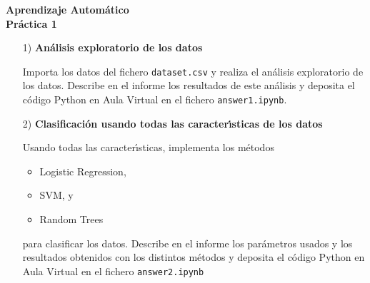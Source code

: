 \documentclass{article}
\begin{document}
\begin{center}
\bf{\large 
{\Large Aprendizaje Autom\'atico}\\
{\vspace{0.1cm}}
Pr\'actica 1
}
\end{center}

\bigskip

\begin{itemize}

\item[1)]  {\bf An\'alisis exploratorio de los datos}

Importa los datos del fichero \texttt{dataset.csv} y realiza el an\'alisis exploratorio de los datos. Describe en el informe los resultados de este análisis y deposita el c\'odigo Python en Aula Virtual en el fichero \texttt{answer1.ipynb}.

\end{itemize}

\bigskip

\begin{itemize}

\item[2)] {\bf Clasificaci\'on usando todas las caracter\'{\i}sticas de los datos}

Usando todas las caracter\'{\i}sticas, implementa los m\'etodos 

\begin{itemize}

\item
Logistic Regression, 

\item
SVM, y

\item
Random Trees

\end{itemize}

para clasificar los datos. Describe en el informe los par\'ametros usados y los resultados obtenidos con los distintos m\'etodos y deposita el c\'odigo Python en Aula Virtual en el fichero \texttt{answer2.ipynb}

\end{itemize}

\bigskip
\end{document}
